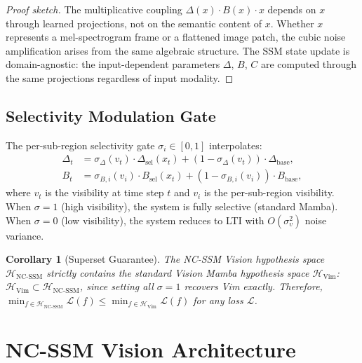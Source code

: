 \documentclass[10pt,twocolumn,letterpaper]{article}
\newtheorem{corollary}{Corollary}
\begin{document}
\begin{proof}[Proof sketch]
The multiplicative coupling $\Delta(x) \cdot B(x) \cdot x$ depends on $x$ through learned projections, not on the semantic content of $x$.
Whether $x$ represents a mel-spectrogram frame or a flattened image patch, the cubic noise amplification arises from the same algebraic structure.
The SSM state update is domain-agnostic: the input-dependent parameters $\Delta$, $B$, $C$ are computed through the same projections regardless of input modality.
\end{proof}

\subsection{Selectivity Modulation Gate}

The per-sub-region selectivity gate $\sigma_i \in [0, 1]$ interpolates:
\begin{align}
\Delta_t &= \sigma_{\Delta}(v_t) \cdot \Delta_{\text{sel}}(x_t) + (1 - \sigma_{\Delta}(v_t)) \cdot \Delta_{\text{base}}, \label{eq:sigma_dt} \\
B_t &= \sigma_{B,i}(v_i) \cdot B_{\text{sel}}(x_t) + (1 - \sigma_{B,i}(v_i)) \cdot B_{\text{base}}, \label{eq:sigma_B}
\end{align}
where $v_t$ is the visibility at time step $t$ and $v_i$ is the per-sub-region visibility.
When $\sigma = 1$ (high visibility), the system is fully selective (standard Mamba).
When $\sigma = 0$ (low visibility), the system reduces to LTI with $O(\sigma_v^2)$ noise variance.

\begin{corollary}[Superset Guarantee]
\label{cor:superset}
The NC-SSM Vision hypothesis space $\mathcal{H}_{\text{NC-SSM}}$ strictly contains the standard Vision Mamba hypothesis space $\mathcal{H}_{\text{Vim}}$:
$\mathcal{H}_{\text{Vim}} \subset \mathcal{H}_{\text{NC-SSM}}$,
since setting all $\sigma = 1$ recovers Vim exactly.
Therefore, $\min_{f \in \mathcal{H}_{\text{NC-SSM}}} \mathcal{L}(f) \leq \min_{f \in \mathcal{H}_{\text{Vim}}} \mathcal{L}(f)$ for any loss $\mathcal{L}$.
\end{corollary}


\section{NC-SSM Vision Architecture}
\label{sec:architecture}
\end{document}
